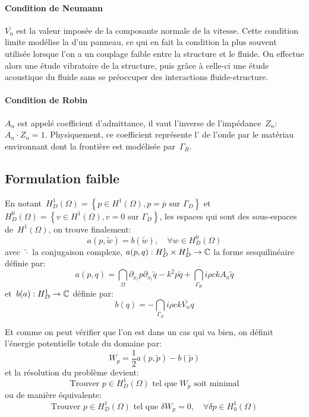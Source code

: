 \paragraph{Condition de Neumann}
$\overline{V_n}$ est la valeur imposée de la composante normale de la vitesse. Cette condition limite modélise la  d'un panneau, ce qui en fait la condition la plus souvent utilisée lorsque l'on a un couplage faible entre la structure et le fluide. On effectue alors une étude vibratoire de la structure, puis grâce à celle-ci une étude acoustique du fluide sans se préoccuper des interactions fluide-structure.

\medskip
\paragraph{Condition de Robin}
$A_n$ est appelé coefficient d'admittance, il vaut l'inverse de l'impédance~$Z_n$:
$A_n\cdot Z_n=1$. Physiquement, ce coefficient représente l' de l'onde par le matériau environnant dont la frontière est modélisée par~$\Gamma_R$.

\medskip
\subsection{Formulation faible}
En notant~$H^1_D(\Omega)=\left\{p\in H^1(\Omega), p=\overline{p} \text{ sur } \Gamma_D\right\}$ et $H^0_D(\Omega)=\left\{v\in H^1(\Omega), v=0 \text{ sur } \Gamma_D\right\}$, les espaces qui sont des sous-espaces de~$H^1(\Omega)$, on trouve finalement:
\begin{equation}a(p,\tilde{w})=b(\tilde{w}), \quad \forall w\in H^0_D(\Omega)\end{equation}
avec~$\tilde{\cdot}$ la conjugaison complexe, $a(p,q): H^1_D\times H^1_D \rightarrow \mathbb C$ la forme sesquilinéaire définie par:
\begin{equation}a(p,q)=\dint_\Omega \partial_{x_i}p\partial_{x_i}\tilde{q}-k^2p\tilde{q} +
\dint_{\Gamma_R} i\rho ckA_n\tilde{q}
\end{equation}
et~$b(a): H^1_D\rightarrow\mathbb C$ définie par:
\begin{equation}b(q)=-\dint_{\Gamma_N} i\rho c k\overline{V_n} q\end{equation}

\medskip
Et comme on peut vérifier que l'on est dans un cas qui va bien, on définit l'énergie potentielle totale du domaine par:
\begin{equation}W_p=\frac12 a(p,\tilde{p})-b(\tilde{p})\end{equation}
et la résolution du problème devient:
\begin{equation}
\text{Trouver } p\in H^1_D(\Omega) \text{ tel que } W_p \text{ soit minimal}
\end{equation}
ou de manière équivalente:
\begin{equation}
\text{Trouver } p\in H^1_D(\Omega) \text{ tel que } \delta W_p=0,\quad \forall\delta p\in H^1_0(\Omega)
\end{equation} 